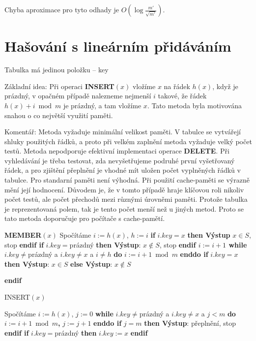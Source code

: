 \documentclass[a4paper,12pt]{article}
\begin{document}
Chyba aproximace pro tyto odhady je $O(\log\frac {m'}{\sqrt {
m'}})$.

\section{Hašování s lineárním přidáváním}

Tabulka má jedinou položku -- key

Základní idea:  Při operaci {\bf INSERT$(x)$} vložíme $
x$ 
na řádek $h(x)$, když je prázdný, v opačném případě 
nalezneme nejmenší $i$ takové, že řádek $h(x)+i\bmod 
m$ je 
prázdný, a tam vložíme $x$. Tato metoda byla motivována snahou o co největší využití paměti. 

Komentář:  Metoda vyžaduje minimální velikost paměti.  
V tabulce se vytvářejí shluky použitých řádků, a proto 
při velkém zaplnění metoda vyžaduje velký počet testů.  
Metoda nepodporuje efektivní implementaci operace {\bf DELETE}.  
Při vy\-hle\-dá\-vá\-ní je třeba testovat, zda nevyšetřujeme 
podruhé první vyšetřovaný řádek, a pro zjištění přeplnění je 
vhodné mít uložen počet vyplněných řádků v tabulce. Pro standarní paměti není výhodná. Při použití cache-paměti se výrazně mění její hodnocení. Důvodem je, že v tomto případě hraje klíčovou roli nikoliv počet testů, ale počet přechodů mezi různými úrovněmi paměti. Protože tabulka je reprezentovaná polem, tak je tento počet menší než u jiných metod. Proto se tato metoda doporučuje pro počítače s cache-pamětí.
\bigskip

{\bf MEMBER$(x)$}\newline 
Spočítáme $i:=h(x)$, $h:=i$\newline 
{\bf if} $i.key=x$ {\bf then Výstup} $x\in S$, stop {\bf endif\newline 
if} $i.key=$prázdný {\bf then {{\rm Výstup}}}: $x\notin S$, stop {\bf endif\newline 
$i:=i+1$\newline 
while} $i.key\ne$prázdný a $i.key\ne x$ a $i\ne h$ {\bf do} $
i:=i+1\bmod m$ {\bf enddo\newline 
if} $i.key=x$ {\bf then Výstup}: $x\in S$ {\bf else Výstup}: $
x\notin S$ {\bf endif
\bigskip

INSERT$(x)$}\newline 
Spočítáme $i:=h(x)$, $j:=0$\newline 
{\bf while} $i.key\ne$prázdný a $i.key\ne x$ a $j<m$ {\bf do} $
i:=i+1\bmod m${\bf ,} $j:=j+1$ {\bf enddo\newline 
if} $j=m$ {\bf then Výstup}: přeplnění, stop {\bf endif\newline 
if} $i.key=$prázdný {\bf then} $i.key:=x$ {\bf endif}
\bigskip
\end{document}
